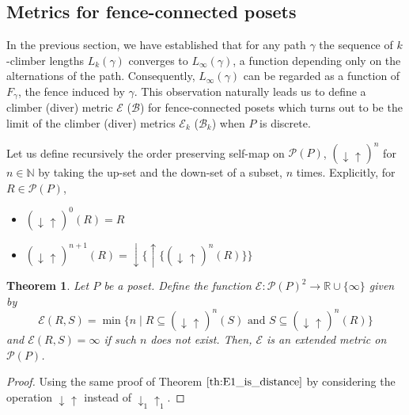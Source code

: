 \documentclass{article}[12pt]
\theoremstyle{exampstyle}
\newtheorem{theorem}{Theorem}[section]
\theoremstyle{remark}
\newcommand{\N}{\mathbb{N}}
\newcommand{\R}{\mathbb{R}}
\newcommand{\B}{\mathcal{B}}
\newcommand{\E}{\mathcal{E}}
\renewcommand{\P}{\mathcal{P}}
\newcommand{\updown}[1][]{\downarrow_{#1} \uparrow_{#1}}
\DeclarePairedDelimiter{\ceil}{\lceil}{\rceil}
\newcommand{\myceil}[2][k]{\ceil[\Big]{\frac{#2 }{#1}}}
\begin{document}
    

\subsection{Metrics for fence-connected posets}



In the previous section, we have established that for any path $\gamma$ the sequence of $k$-climber lengths $L_k(\gamma)$ converges to $L_\infty(\gamma)$, a function depending only on the alternations of the path. Consequently, $L_\infty(\gamma)$ can be regarded as a function of $F_\gamma$, the fence induced by $\gamma$. This observation naturally leads us to define a climber (diver) metric $\E$ ($\B$) for fence-connected posets which turns out to be the limit of the climber (diver) metrics $\E_k$ ($\B_k$) when $P$ is discrete.

Let us define recursively the order preserving self-map on $\P(P)$, $(\updown)^{n}$ for $n \in \N$ by taking the up-set and the down-set of a subset, $n$ times. Explicitly, for $R \in \P(P)$,
\begin{itemize}
    \item $(\updown)^0 (R) = R$
    \item $(\updown)^{n+1} (R) = \downarrow \big\{ \uparrow \{(\updown)^{n} (R) \} \big\}$
\end{itemize}

\begin{theorem}
        Let $P$ be a poset. Define the function $\E: \P(P)^ 2 \to \R \cup \{ \infty\}$ given by 
            \begin{equation*}
                \E(R,S) = \min \{ n \mid R \subseteq (\updown)^{n} (S) \text{ and } S \subseteq (\updown)^{n} (R) \}
            \end{equation*}
            and $\E(R,S) = \infty$ if such $n$ does not exist. Then, $\E$ is an extended metric on $\P(P)$.
\end{theorem}
\begin{proof}
   Using the same proof of Theorem $\ref{th:E1_is_distance}$ by considering the operation $\updown$ instead of $\updown[1]$.
\end{proof}
\end{document}

